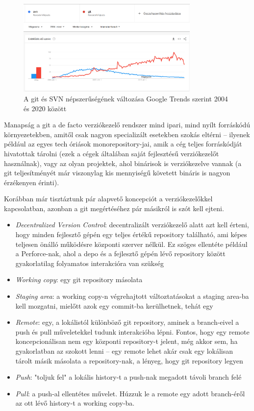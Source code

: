 \begin{figure}[H]
    \centering
    \includegraphics[width=0.8\textwidth]{images/gitsvn.png}
    \caption{A git és SVN népszerűségének változása Google Trends szerint 2004 és 2020 között}
    \label{fig:git-svn-trends}
\end{figure}


Manapság a git a de facto verziókezelő rendszer mind ipari, mind nyílt forráskódú környezetekben, amitől csak nagyon specializált esetekben szokás eltérni -- ilyenek például az egyes tech óriások monorepository-jai, amik a cég teljes forráskódját hivatottak tárolni (ezek a cégek általában saját fejlesztésű verziókezelőt használnak), vagy az olyan projektek, ahol binárisok is verziókezelve vannak (a git teljesítményét már viszonylag kis mennyiségű követett bináris is nagyon érzékenyen érinti).

Korábban már tisztáztunk pár alapvető koncepciót a verziókezelőkkel kapcsolatban, azonban a git megértéséhez pár másikról is szót kell ejteni.

\begin{itemize}
    \item \textit{Decentralized Version Control}: decentralizált verziókezelő alatt azt kell érteni, hogy minden fejlesztő gépén egy teljes értékű repository található, ami képes teljesen önálló működésre központi szerver nélkül. Ez szöges ellentéte például a Perforce-nak, ahol a depo és a fejlesztő gépén lévő repository között gyakorlatilag folyamatos interakcióra van szükség
    \item \textit{Working copy}: egy git repository másolata
    \item \textit{Staging area}: a working copy-n végrehajtott változtatásokat a staging area-ba kell mozgatni, mielőtt azok egy commit-ba kerülhetnek, tehát egy
    \item \textit{Remote}: egy, a lokálistól különböző git repository, aminek a branch-eivel a push és pull műveletekkel tudunk interakcióba lépni. Fontos, hogy egy remote koncepcionálisan nem egy központi repository-t jelent, még akkor sem, ha gyakorlatban az szokott lenni -- egy remote lehet akár csak egy lokálisan tárolt másik másolata a repository-nak, a lényeg, hogy git repository legyen
    \item \textit{Push}: "toljuk fel" a lokális history-t a push-nak megadott távoli branch felé
    \item \textit{Pull}: a push-al ellentétes művelet. Húzzuk le a remote egy adott branch-éről az ott lévő history-t a working copy-ba.
\end{itemize}

